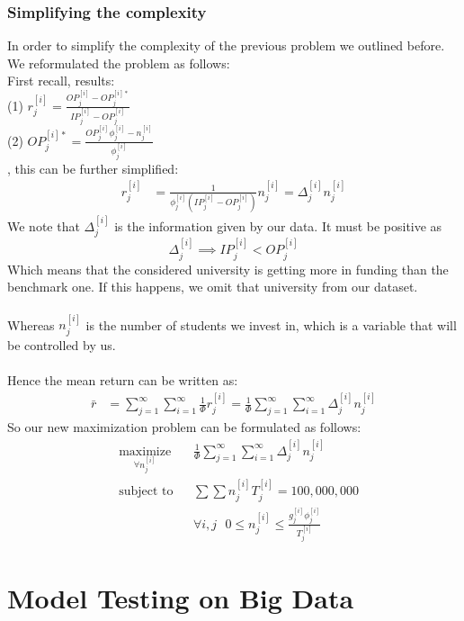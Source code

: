 \documentclass[12pt]{scrartcl}
\begin{document}
	\subsubsection{Simplifying the complexity}
		In order to simplify the complexity of the previous problem we outlined before. We reformulated the problem as follows:\\
		First recall, results:\\
		(1) $r_j^{[i]} = \frac{ OP_j^{[i]} - OP_j^{[i]*}  }{ IP_j^{[i]} - 
		OP_j^{[i]}  }$\\
		(2) $OP_j^{[i]*} = \frac{  OP_j^{[i]}\phi_j^{[i]}-n_j^{[i]}  }{ \phi_j^{[i]}  }$\\
		, this can be further simplified:
		\begin{align*}
			r_j^{[i]} &= \frac{1 }{ \phi_j^{[i]} (IP_j^{[i]} - OP_j^{[i]} ) } n_j^{[i]} = \Delta_j^{[i]} n_j^{[i]}
		\end{align*}	
		We note that $\Delta_j^{[i]}$ is the information given by our data. It must be positive as $$\Delta_j^{[i]}\implies IP_j^{[i]} < OP_j^{[i]}$$
		Which means that the considered university is getting more in funding than the benchmark one. If this happens, we omit that university from our dataset.\\ 
		\\
		Whereas $n_j^{[i]}$ is the number of students we invest in, which is a variable that will be controlled by us.\\
		\\
		Hence the mean return can be written as:
		\begin{align*}
			\bar{r} &= \sum_{j=1}^\infty\sum_{i=1}^\infty \frac{ 1  }{ \Phi } r_j^{[i]} = \frac{ 1  }{ \Phi }\sum_{j=1}^\infty\sum_{i=1}^\infty \Delta_j^{[i]}n_j^{[i]}
		\end{align*}
		So our new maximization problem can be formulated as follows:
		\begin{equation*}
				\begin{aligned}
					& \underset{\forall n_j^{[i]}}{\text{maximize}}
					& &\frac{ 1  }{ \Phi }\sum_{j=1}^\infty\sum_{i=1}^\infty \Delta_j^{[i]}n_j^{[i]}\\
					& \text{subject to}
					& & \sum \sum n_j^{[i]}T_j^{[i]} = 100,000,000\\
					&&& \forall i,j \ \ \ 0\le n_j^{[i]} \le \frac{g_j^{[i]}\phi_j^{[i]}}{T_j^{[i]}}
				\end{aligned}	
		\end{equation*}
		
\section{Model Testing on Big Data} 
\end{document}
